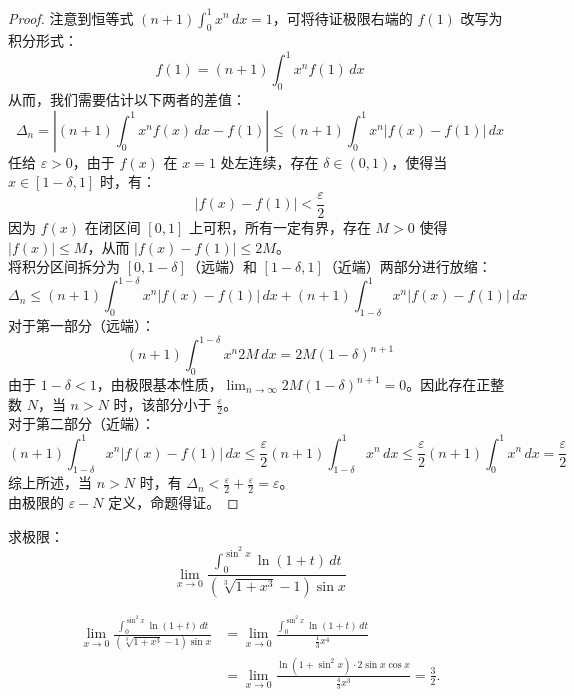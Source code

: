 \documentclass[lang=cn,12pt]{elegantbook}
\begin{document}
\begin{proof}
    注意到恒等式 $(n+1) \int_0^1 x^n \, dx = 1$，可将待证极限右端的 $f(1)$ 改写为积分形式：
    \[ f(1) = (n+1) \int_0^1 x^n f(1) \, dx \]
    从而，我们需要估计以下两者的差值：
    \[ \Delta_n = \left| (n+1) \int_0^1 x^n f(x) \, dx - f(1) \right| \le (n+1) \int_0^1 x^n |f(x) - f(1)| \, dx \]
    任给 $\varepsilon > 0$，由于 $f(x)$ 在 $x=1$ 处左连续，存在 $\delta \in (0, 1)$，使得当 $x \in [1-\delta, 1]$ 时，有：
    \[ |f(x) - f(1)| < \frac{\varepsilon}{2} \]
    因为 $f(x)$ 在闭区间 $[0, 1]$ 上可积，所有一定有界，存在 $M > 0$ 使得 $|f(x)| \le M$，从而 $|f(x) - f(1)| \le 2M$。 \\
    将积分区间拆分为 $[0, 1-\delta]$（远端）和 $[1-\delta, 1]$（近端）两部分进行放缩：
    \[ \Delta_n \le (n+1) \int_0^{1-\delta} x^n |f(x) - f(1)| \, dx + (n+1) \int_{1-\delta}^1 x^n |f(x) - f(1)| \, dx \]
    对于第一部分（远端）：
    \[ (n+1) \int_0^{1-\delta} x^n 2M \, dx = 2M (1-\delta)^{n+1} \]
    由于 $1-\delta < 1$，由极限基本性质，$\lim_{n \to \infty} 2M (1-\delta)^{n+1} = 0$。因此存在正整数 $N$，当 $n > N$ 时，该部分小于 $\frac{\varepsilon}{2}$。 \\
    对于第二部分（近端）：
    \[ (n+1) \int_{1-\delta}^1 x^n |f(x) - f(1)| \, dx \le \frac{\varepsilon}{2} (n+1) \int_{1-\delta}^1 x^n \, dx \le \frac{\varepsilon}{2} (n+1) \int_0^1 x^n \, dx = \frac{\varepsilon}{2} \]
    综上所述，当 $n > N$ 时，有 $\Delta_n < \frac{\varepsilon}{2} + \frac{\varepsilon}{2} = \varepsilon$。 \\
    由极限的 $\varepsilon-N$ 定义，命题得证。
\end{proof}

\vspace{1em}

\begin{example}
    求极限：
    \[\lim\limits_{x \to 0} \dfrac{\int_{0}^{\sin^{2}x} \ln(1 + t) \, dt}{\left( \sqrt[3]{1 + x^{3}} - 1 \right) \sin x} \]
\end{example}

\begin{solution}
\begin{align*}
\lim_{x \to 0} \frac{\int_{0}^{\sin^{2}x} \ln(1 + t) \, dt}{\left( \sqrt[3]{1 + x^{3}} - 1 \right) \sin x}
&= \lim_{x \to 0} \frac{\int_{0}^{\sin^{2}x} \ln(1 + t) \, dt}{\frac{1}{3}x^{4}} \\
&= \lim_{x \to 0} \frac{\ln(1 + \sin^{2}x) \cdot 2\sin x \cos x}{\frac{4}{3}x^{3}} = \frac{3}{2}.
\end{align*}
\end{solution}
\end{document}
